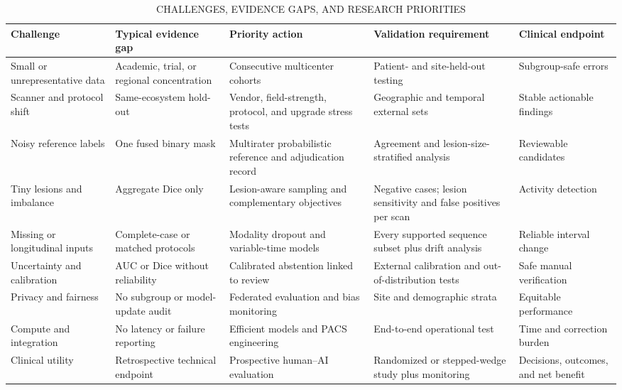 \documentclass[journal,twoside,web]{ieeecolor}
\begin{document}
\begin{table}[!t]
\centering
\caption{CHALLENGES, EVIDENCE GAPS, AND RESEARCH PRIORITIES}
\label{tab:6}
\scriptsize
\setlength{\tabcolsep}{2.2pt}
\renewcommand{\arraystretch}{1.10}
\begin{tabularx}{\textwidth}{@{}ZZZZZ@{}}
\toprule
\textbf{Challenge} & \textbf{Typical evidence gap} & \textbf{Priority action} & \textbf{Validation requirement} & \textbf{Clinical endpoint} \\
\midrule
Small or unrepresentative data & Academic, trial, or regional concentration & Consecutive multicenter cohorts & Patient- and site-held-out testing & Subgroup-safe errors \\
Scanner and protocol shift & Same-ecosystem hold-out & Vendor, field-strength, protocol, and upgrade stress tests & Geographic and temporal external sets & Stable actionable findings \\
Noisy reference labels & One fused binary mask & Multirater probabilistic reference and adjudication record & Agreement and lesion-size-stratified analysis & Reviewable candidates \\
Tiny lesions and imbalance & Aggregate Dice only & Lesion-aware sampling and complementary objectives & Negative cases; lesion sensitivity and false positives per scan & Activity detection \\
Missing or longitudinal inputs & Complete-case or matched protocols & Modality dropout and variable-time models & Every supported sequence subset plus drift analysis & Reliable interval change \\
Uncertainty and calibration & AUC or Dice without reliability & Calibrated abstention linked to review & External calibration and out-of-distribution tests & Safe manual verification \\
Privacy and fairness & No subgroup or model-update audit & Federated evaluation and bias monitoring & Site and demographic strata & Equitable performance \\
Compute and integration & No latency or failure reporting & Efficient models and PACS engineering & End-to-end operational test & Time and correction burden \\
Clinical utility & Retrospective technical endpoint & Prospective human--AI evaluation & Randomized or stepped-wedge study plus monitoring & Decisions, outcomes, and net benefit \\
\bottomrule
\end{tabularx}
\end{table}
\end{document}
